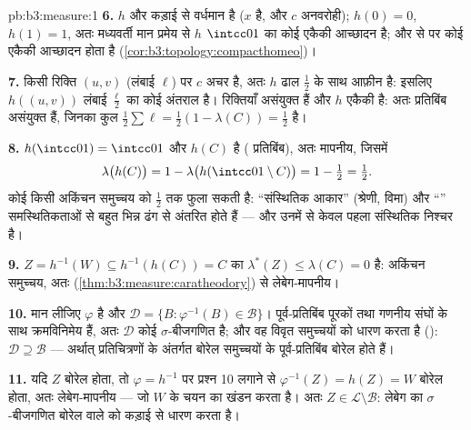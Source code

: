 \begin{solution}{pb:b3:measure:1}
\textbf{6.} $h$  और कड़ाई से वर्धमान है ($x$ है, और $c$
अनवरोही); $h(0) = 0$, $h(1) = 1$, अतः मध्यवर्ती मान प्रमेय से $h$ $\intcc01$ का
कोई  एकैकी आच्छादन है; और  से  पर
कोई  एकैकी आच्छादन  होता है (\cref{cor:b3:topology:compacthomeo})।

\textbf{7.} किसी रिक्ति $(u, v)$ (लंबाई $\ell$) पर $c$ अचर है, अतः
$h$ ढाल $\frac12$ के साथ आफ़ीन है: इसलिए $h((u,v))$ लंबाई $\frac\ell2$ का कोई अंतराल
है। रिक्तियाँ असंयुक्त हैं और $h$ एकैकी है: अतः प्रतिबिंब असंयुक्त
हैं, जिनका कुल  $\frac12\sum\ell = \frac12(1 - \lambda(C)) = \frac12$ है।

\textbf{8.} $h(\intcc01) = \intcc01$ और $h(C)$  है ( प्रतिबिंब), अतः मापनीय,
जिसमें
\[
\lambda\bigl(h(C)\bigr) = 1 -
\lambda\bigl(h(\intcc01\setminus C)\bigr) = 1 - \tfrac12 =
\tfrac12 .
\]
कोई  किसी अकिंचन समुच्चय को  $\frac12$ तक फुला सकती है:
``संस्थितिक आकार'' (श्रेणी, विमा) और ``'' समस्थितिकताओं से बहुत
भिन्न ढंग से अंतरित होते हैं --- और उनमें से केवल पहला संस्थितिक
निश्चर है।

\textbf{9.} $Z = h^{-1}(W) \subseteq h^{-1}(h(C)) = C$ का $\lambda^*(Z) \leq \lambda(C) = 0$ है: अकिंचन समुच्चय, अतः  (\cref{thm:b3:measure:caratheodory})
से लेबेग-मापनीय।

\textbf{10.} मान लीजिए $\varphi$  है और $\mathcal D = \{B
: \varphi^{-1}(B) \in \mathcal B\}$। पूर्व-प्रतिबिंब पूरकों
तथा गणनीय संघों के साथ क्रमविनिमेय हैं, अतः $\mathcal D$ कोई $\sigma$-बीजगणित
है; और वह विवृत समुच्चयों को धारण करता है (): $\mathcal D \supseteq \mathcal B$ --- अर्थात्
 प्रतिचित्रणों के अंतर्गत बोरेल समुच्चयों के पूर्व-प्रतिबिंब
बोरेल होते हैं।

\textbf{11.} यदि $Z$ बोरेल होता, तो  $\varphi = h^{-1}$ पर प्रश्न 10 लगाने
से $\varphi^{-1}(Z) = h(Z) = W$ बोरेल होता, अतः लेबेग-मापनीय --- जो $W$ के चयन का खंडन
करता है। अतः $Z \in \mathcal L \setminus \mathcal B$: लेबेग का $\sigma$-बीजगणित बोरेल वाले को
कड़ाई से धारण करता है।


\end{solution}
